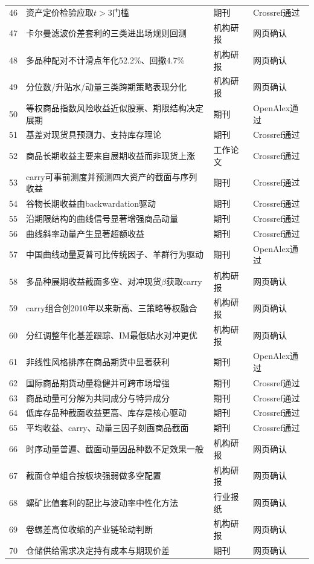 \documentclass[12pt,a4paper]{ctexart}
\begin{document}
{\begin{longtable}{p{28.45pt}p{244.69pt}p{48.37pt}p{85.36pt}}
46 & 资产定价检验应取$t > 3$门槛 & 期刊 & Crossref通过 \\
47 & 卡尔曼滤波价差套利的三类进出场规则回测 & 机构研报 & 网页确认 \\
48 & 多品种配对不计滑点年化52.2\%、回撤4.7\% & 机构研报 & 网页确认 \\
49 & 分位数/升贴水/动量三类跨期策略表现分化 & 机构研报 & 网页确认 \\
50 & 等权商品指数风险收益近似股票、期限结构决定展期 & 期刊 & OpenAlex通过 \\
51 & 基差对现货具预测力、支持库存理论 & 期刊 & Crossref通过 \\
52 & 商品长期收益主要来自展期收益而非现货上涨 & 工作论文 & Crossref通过 \\
53 & carry可事前测度并预测四大资产的截面与序列收益 & 期刊 & Crossref通过 \\
54 & 谷物长期收益由backwardation驱动 & 期刊 & Crossref通过 \\
55 & 沿期限结构的曲线信号显著增强商品动量 & 期刊 & Crossref通过 \\
56 & 曲线斜率动量产生显著超额收益 & 期刊 & Crossref通过 \\
57 & 中国曲线动量夏普可比传统因子、羊群行为驱动 & 期刊 & OpenAlex通过 \\
58 & 多品种展期收益截面多空、对冲现货$\beta$获取carry & 机构研报 & 网页确认 \\
59 & carry组合创2010年以来新高、三策略等权融合 & 机构研报 & 网页确认 \\
60 & 分红调整年化基差跟踪、IM最低贴水对冲更优 & 机构研报 & 网页确认 \\
61 & 非线性风格排序在商品期货中显著获利 & 期刊 & OpenAlex通过 \\
62 & 国际商品期货动量稳健并可跨市场增强 & 期刊 & Crossref通过 \\
63 & 商品动量可分解为共同成分与特异成分 & 期刊 & Crossref通过 \\
64 & 低库存品种截面收益更高、库存是核心驱动 & 期刊 & Crossref通过 \\
65 & 平均收益、carry、动量三因子刻画商品截面 & 期刊 & Crossref通过 \\
66 & 时序动量普遍、截面动量因品种数不足效果一般 & 机构研报 & 网页确认 \\
67 & 截面仓单组合按板块强弱做多空配置 & 机构研报 & 网页确认 \\
68 & 螺矿比值套利的配比与波动率中性化方法 & 行业报纸 & 网页确认 \\
69 & 卷螺差高位收缩的产业链轮动判断 & 机构研报 & 网页确认 \\
70 & 仓储供给需求决定持有成本与期现价差 & 期刊 & 网页确认 \\

\end{longtable}}
\end{document}
